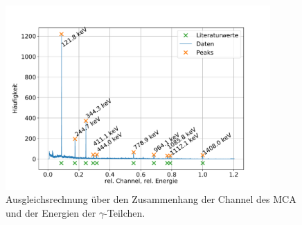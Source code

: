 \begin{figure}[h!]
  \centering
  \includegraphics[width=0.9\textwidth]{content/images/spektrum_europium_kali.pdf}
  \caption{Ausgleichsrechnung über den Zusammenhang der Channel des MCA und der Energien der $\gamma$-Teilchen.}
  \label{fig:kalibration}
\end{figure}






